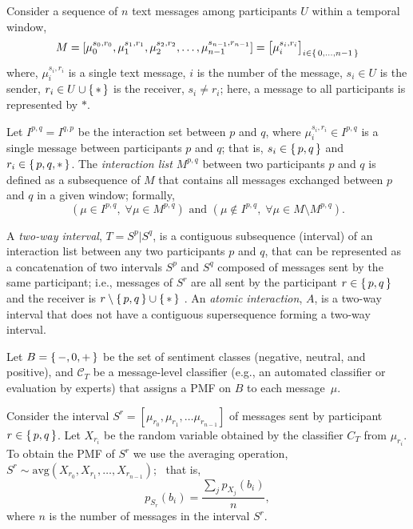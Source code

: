 \documentclass[3p,times,preprint]{elsarticle}
\begin{document}
Consider a sequence of $n$ text  messages 
among participants $U$ within a temporal window,
\begin{equation}
M = [\mu_0^{s_0,r_0}, \mu_1^{{s_1,r_1}}, \mu_2^{s_2,r_2}, \ldots, \mu_{n-1}^{s_{n-1},r_{n-1}}] = \left[\mu_i^{s_i,r_i}\right]_{i\in \set{0,\ldots, n-1}}
\end{equation}
where, $\mu_i^{s_i,r_i}$ is a single text message, $i$ is the number of the message, $s_i \in U$ is the sender, $r_i \in U \cup \set{*}$ is the receiver, $s_i \neq r_i$; here, a message to all participants is represented by $*$. 

Let $I^{p,q} = I^{q,p}$ be the interaction set between $p$ and $q$, where $\mu_i^{s_i,r_i} \in I^{p,q}$ is a single message between participants $p$ and $q$; that is, $s_i \in  \set{p,q}$ and   $r_i \in \set{p,q,*}$. The \textit{interaction list} $M^{p,q}$ between two participants $p$ and $q$ is defined as a subsequence of $M$ that contains all messages exchanged between $p$ and $q$ in a given window; formally, %
\begin{equation}
(\mu \in I^{p,q}, \; \forall \mu \in M^{p,q})  \text{ and }  (\mu \not\in I^{p,q}, \; \forall \mu \in M \setminus M^{p,q}).
\end{equation} %


A \textit{two-way interval}, $T=S^p|S^q$, is a contiguous subsequence (interval)  of an interaction list between any two participants $p$ and $q$, that can be represented as a concatenation of two intervals $S^p$ and $S^q$ composed of messages sent by the same participant; i.e., messages of $S^r$ are all sent by the participant $r \in \set{p,q}$ and the receiver is $r \setminus \set{p,q} \cup \set{*}$ .
An \textit{atomic interaction}, $\mathit{A}$, is a two-way interval that does not have a contiguous supersequence forming a two-way interval.

Let $B=\set{-,0,+}$ be the set of sentiment classes (negative, neutral, and positive), and  $\mathcal{C}_T$ be a message-level classifier (e.g., an automated classifier or evaluation by experts) that assigns a PMF on $B$ to each \mbox{message $\mu$.}
%

Consider the interval $S^r = [\mu_{r_0},\mu_{r_1}, \ldots \mu_{r_{n-1}}]$ of messages sent by participant $r \in  \set{p,q}$. Let $X_{r_i}$ be the random variable obtained by the classifier $C_T$ from $\mu_{r_i}$. To obtain the PMF of $S^r$ we use the averaging operation, \mbox{$S^r \sim \mathrm{avg}(X_{r_0}, X_{r_1}, \ldots, X_{r_{n-1}})$; } that is,
%
\begin{equation}
    p_{S_r}(b_i) = \frac{\sum_j p_{X_j}(b_i)}
    {n},
\end{equation}%
where $n$ is the number of messages in the interval $S^r$.
\end{document}
